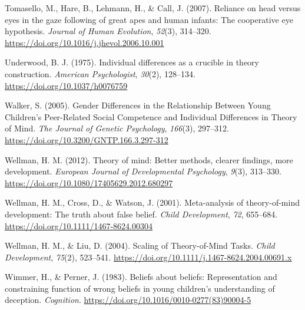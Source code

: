 \documentclass[
  man,floatsintext]{apa6}
\newlength{\cslhangindent}
\newlength{\cslentryspacingunit} %
\newenvironment{CSLReferences}[2] %
 {%
  \setlength{\parindent}{0pt}
  \ifodd #1
  \let\oldpar\par
  \def\par{\hangindent=\cslhangindent\oldpar}
  \fi
  \setlength{\parskip}{#2\cslentryspacingunit}
 }%
 {}
\begin{document}
\begin{CSLReferences}{1}{0}
\leavevmode{}%
Tomasello, M., Hare, B., Lehmann, H., \& Call, J. (2007). Reliance on head versus eyes in the gaze following of great apes and human infants: The cooperative eye hypothesis. \emph{Journal of Human Evolution}, \emph{52}(3), 314--320. \url{https://doi.org/10.1016/j.jhevol.2006.10.001}

\leavevmode{}%
Underwood, B. J. (1975). Individual differences as a crucible in theory construction. \emph{American Psychologist}, \emph{30}(2), 128--134. \url{https://doi.org/10.1037/h0076759}

\leavevmode{}%
Walker, S. (2005). Gender {Differences} in the {Relationship Between Young Children}'s {Peer-Related Social Competence} and {Individual Differences} in {Theory} of {Mind}. \emph{The Journal of Genetic Psychology}, \emph{166}(3), 297--312. \url{https://doi.org/10.3200/GNTP.166.3.297-312}

\leavevmode{}%
Wellman, H. M. (2012). Theory of mind: {Better} methods, clearer findings, more development. \emph{European Journal of Developmental Psychology}, \emph{9}(3), 313--330. \url{https://doi.org/10.1080/17405629.2012.680297}

\leavevmode{}%
Wellman, H. M., Cross, D., \& Watson, J. (2001). Meta-analysis of theory-of-mind development: {The} truth about false belief. \emph{Child Development}, \emph{72}, 655--684. \url{https://doi.org/10.1111/1467-8624.00304}

\leavevmode{}%
Wellman, H. M., \& Liu, D. (2004). Scaling of {Theory-of-Mind Tasks}. \emph{Child Development}, \emph{75}(2), 523--541. \url{https://doi.org/10.1111/j.1467-8624.2004.00691.x}

\leavevmode{}%
Wimmer, H., \& Perner, J. (1983). Beliefs about beliefs: {Representation} and constraining function of wrong beliefs in young children's understanding of deception. \emph{Cognition}. \url{https://doi.org/10.1016/0010-0277(83)90004-5}

\end{CSLReferences}

\endgroup
\end{document}
